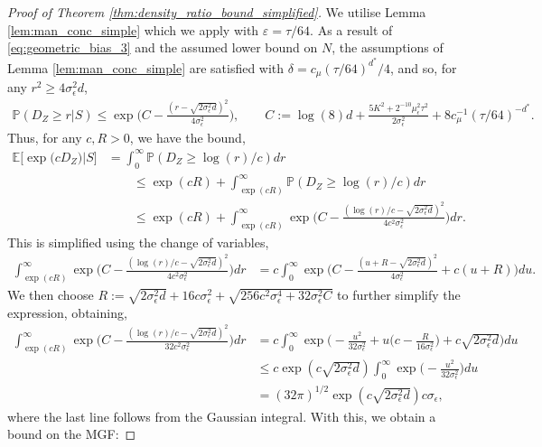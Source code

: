 \documentclass[10pt]{article}
\theoremstyle{plain}
\theoremstyle{definition}
\theoremstyle{remark}
\newcommand{\E}{\mathbb{E}}
\newcommand{\prob}{\mathbb{P}}
\begin{document}
\begin{proof}[Proof of Theorem \ref{thm:density_ratio_bound_simplified}]
We utilise Lemma \ref{lem:man_conc_simple} which we apply with \(\varepsilon = \tau/64\). As a result of \eqref{eq:geometric_bias_3} and the assumed lower bound on \(N\), the assumptions of Lemma \ref{lem:man_conc_simple} are satisfied with \(\delta = c_\mu (\tau/64)^{d^*}/4\), and so, for any \(r^2 \geq 4 \sigma_\epsilon^2 d\),
\begin{align*}
    \prob(D_Z \geq r|S) \leq \exp \Big ( C - \tfrac{(r-\sqrt{2\sigma_\epsilon^2 d})^2}{4 \sigma_\epsilon^2} \Big ), \qquad C := \log(8) d + \frac{5K^2 + 2^{-10} \mu_\epsilon^2 \tau^2}{2\sigma_\epsilon^2} + 8 c_\mu^{-1} (\tau/64)^{-d^*}.
\end{align*}
Thus, for any \(c, R > 0\), we have the bound,
\begin{align*}
    \E \big [ \exp \big ( c D_Z \big ) \big | S \big ] &= \int_0^\infty \prob ( D_Z \geq \log(r)/c ) dr\\
    &\qquad \leq \exp(cR) + \int_{\exp(cR)}^\infty \prob ( D_Z \geq \log(r)/c ) dr\\
    &\qquad \leq \exp(cR) + \int_{\exp(cR)}^\infty \exp \bigg ( C - \frac{(\log(r)/c - \sqrt{2 \sigma_\epsilon^2 d})^2}{4 c^2 \sigma_\epsilon^2} \bigg ) dr.
\end{align*}
This is simplified using the change of variables,
\begin{align*}
    \int_{\exp(cR)}^\infty \exp \bigg ( C - \frac{(\log(r)/c - \sqrt{2 \sigma_\epsilon^2 d})^2}{4 c^2 \sigma_\epsilon^2} \bigg ) dr &= c \int_0^\infty \exp \bigg ( C - \frac{(u+R-\sqrt{2 \sigma_\epsilon^2 d})^2}{4 \sigma_\epsilon^2} + c(u + R) \bigg ) du.
\end{align*}
We then choose \(R := \sqrt{2 \sigma_\epsilon^2 d} + 16 c \sigma_\epsilon^2 + \sqrt{256 c^2 \sigma_\epsilon^4 + 32 \sigma_\epsilon^2 C}\) to further simplify the expression, obtaining,
\begin{align*}
    \int_{\exp(cR)}^\infty \exp \bigg ( C - \frac{(\log(r)/c - \sqrt{2 \sigma_\epsilon^2 d})^2}{32 c^2 \sigma_\epsilon^2} \bigg ) dr &= c \int_0^\infty \exp \bigg ( - \frac{u^2}{32 \sigma_\epsilon^2} + u \bigg ( c - \frac{R}{16 \sigma_\epsilon^2} \bigg ) + c \sqrt{2 \sigma_\epsilon^2 d} \bigg ) du\\
    &\leq c \exp(c \sqrt{2 \sigma_\epsilon^2 d}) \int_0^\infty \exp \bigg ( - \frac{u^2}{32 \sigma_\epsilon^2} \bigg ) du\\
    &= (32 \pi)^{1/2} \exp(c \sqrt{2 \sigma_\epsilon^2 d}) c \sigma_\epsilon,
\end{align*}
where the last line follows from the Gaussian integral. With this, we obtain a bound on the MGF:

\end{proof}
\end{document}
